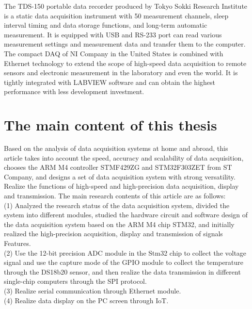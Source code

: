 The TDS-150 portable data recorder produced by Tokyo Sokki Research Institute is a static data acquisition instrument with 50 measurement channels, sleep interval timing and data storage functions, and long-term automatic measurement. It is equipped with USB and RS-233 port can read various measurement settings and measurement data and transfer them to the computer. The compact DAQ of NI Company in the United States is combined with Ethernet technology to extend the scope of high-speed data acquisition to remote sensors and electronic measurement in the laboratory and even the world. It is tightly integrated with LABVIEW software and can obtain the highest performance with less development investment.

\section{The main content of this thesis}
\label{The main content of this thesis}
Based on the analysis of data acquisition systems at home and abroad, this article takes into account the speed, accuracy and scalability of data acquisition, chooses the ARM M4 controller STMF429ZG and STM32F303ZET from ST Company, and designs a set of data acquisition system with strong versatility. Realize the functions of high-speed and high-precision data acquisition, display and transmission. The main research contents of this article are as follows:
\\
(1) Analyzed the research status of the data acquisition system, divided the system into different modules, studied the hardware circuit and software design of the data acquisition system based on the ARM M4 chip STM32, and initially realized the high-precision acquisition, display and transmission of signals Features.
\\
(2) Use the 12-bit precision ADC module in the Stm32 chip to collect the voltage signal and use the capture mode of the GPIO module to collect the temperature through the DS18b20 sensor, and then realize the data transmission in different single-chip computers through the SPI protocol.
\\
(3) Realize serial communication through Ethernet module.
\\
(4) Realize data display on the PC screen through IoT.
 





